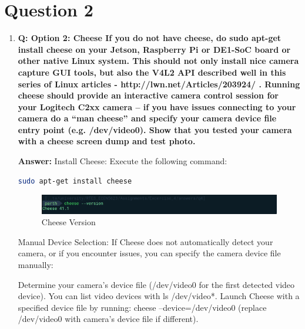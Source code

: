 \documentclass[a4paper,11pt]{article}%
\newenvironment{qanda}{\setlength{\parindent}{0pt}}{\bigskip}
\newcommand{\Q}{\bigskip\bfseries Q: }
\newcommand{\A}{\par\textbf{Answer: } \normalfont}
\begin{document}
\begin{qanda}
	\section{Question 2}
	\begin{enumerate}
		\item[] \Q Option 2: Cheese
			If you do not have cheese, do sudo apt-get install cheese on your Jetson, Raspberry Pi or DE1-SoC
			board or other native Linux system. This should not only install nice camera capture GUI tools, but
			also the V4L2 API described well in this series of Linux articles - http://lwn.net/Articles/203924/ .
			Running cheese should provide an interactive camera control session for your Logitech C2xx camera
			– if you have issues connecting to your camera do a “man cheese” and specify your camera device
			file entry point (e.g. /dev/video0). Show that you tested your camera with a cheese screen dump and
			test photo.
			\A
			Install Cheese: Execute the following command:\\
			\begin{lstlisting}[language=sh]
sudo apt-get install cheese
			\end{lstlisting}
			\begin{figure}[H]
				\centering
				\includegraphics[scale=0.45]{figures/cheese_version.png}
				\caption{Cheese Version}
			\end{figure}

			Manual Device Selection: If Cheese does not automatically detect your camera, or if you encounter issues, you can specify the camera device file manually:

			Determine your camera's device file (/dev/video0 for the first detected video device). You can list video devices with ls /dev/video*.
			Launch Cheese with a specified device file by running: cheese --device=/dev/video0 (replace /dev/video0 with camera's device file if different).


\end{enumerate}
\end{qanda}
\end{document}
